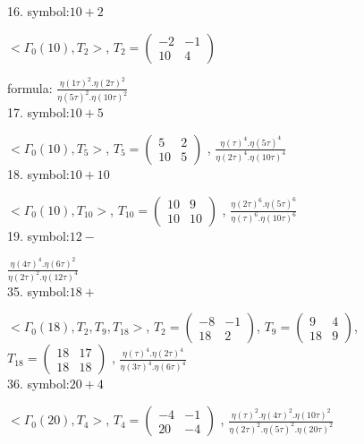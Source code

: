 

16. symbol:$ 10+2 $

$ < \Gamma_0 ( 10 ), T_2 >  $,
$
T_2 = 
\left(
\begin{array}{cc}
-2 & -1 \\
10 & 4
\end{array}
\right)
$

formula: 
$ \frac{\eta(1\tau)^2 . \eta(2\tau)^2}{\eta(5\tau)^2 . \eta(10\tau)^2} $
\\

17. symbol:$ 10+5 $

$ < \Gamma_0 ( 10 ), T_5 >  $,
$
T_5 = 
\left(
\begin{array}{cc}
5 & 2 \\
10 & 5
\end{array}
\right)
$
, {$ \frac{\eta(\tau)^4 . \eta(5\tau)^4}{\eta(2\tau)^4 . \eta(10\tau)^4} $}
\\

18. symbol:$ 10+10 $

$ < \Gamma_0 ( 10 ), T_{10} >  $,
$
T_{10} = 
\left(
\begin{array}{cc}
10 & 9 \\
10 & 10
\end{array}
\right)
$
, {$ \frac{\eta(2\tau)^6 . \eta(5\tau)^6 }{\eta(\tau)^6 . \eta(10\tau)^6 } $}
\\

19. symbol:$ 12- $

 {$ \frac{\eta(4\tau)^4 . \eta(6\tau)^2}{\eta(2\tau)^2 . \eta(12\tau)^4} $}
\\

35. symbol:$ 18+ $

$ < \Gamma_0 ( 18 ), T_2, T_9, T_{18} >  $,
$
T_2 = 
\left(
\begin{array}{cc}
-8 & -1 \\
18 & 2
\end{array}
\right)
$,
$
T_9 = 
\left(
\begin{array}{cc}
9 & 4 \\
18 & 9
\end{array}
\right)
$,
$
T_{18} = 
\left(
\begin{array}{cc}
18 & 17 \\
18 & 18
\end{array}
\right)
$
, {$ \frac{\eta(\tau)^4 . \eta(2\tau)^4}{\eta(3\tau)^4 . \eta(6\tau)^4} $}
\\

36. symbol:$ 20+4 $

$ < \Gamma_0 ( 20 ), T_4 >  $,
$
T_4 = 
\left(
\begin{array}{cc}
-4 & -1 \\
20 & -4
\end{array}
\right)
$
, {$ \frac{\eta(\tau)^2 . \eta(4\tau)^2 . \eta(10\tau)^2}{\eta(2\tau)^2 . \eta(5\tau)^2 . \eta(20\tau)^2} $}
\\

